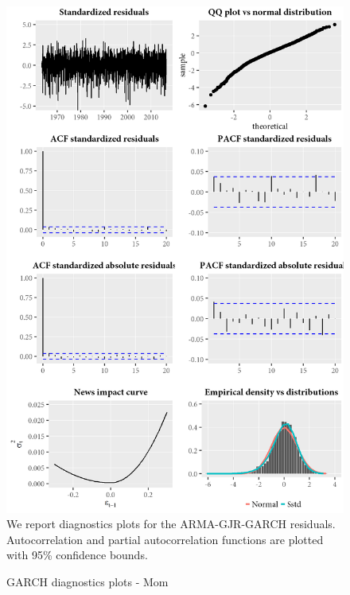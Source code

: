 \begin{figure}[H]
  \caption{GARCH diagnostics plots - Mom}
  \label{diag:garchdiagMom}
  \centering
  \begin{minipage}{\textwidth}
  \includegraphics[scale=1]{graphics/garch/garch_diagnosticsMom.png}  
  \vspace{3mm}
  \footnotesize
  We report diagnostics plots for the ARMA-GJR-GARCH residuals. Autocorrelation and partial autocorrelation functions are plotted with 95\% confidence bounds.
  \end{minipage}
\end{figure}
